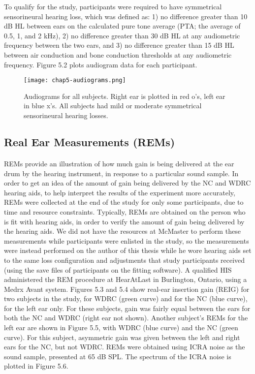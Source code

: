 To qualify for the study, participants were required to have symmetrical sensorineural hearing loss, which was defined as: 1) no difference greater than 10 dB HL between ears on the calculated pure tone average (PTA; the average of 0.5, 1, and 2 kHz), 2) no difference greater than 30 dB HL at any audiometric frequency between the two ears, and 3) no difference greater than 15 dB HL between air conduction and bone conduction thresholds at any audiometric frequency.  Figure 5.2 plots audiogram data for each participant.

\begin{figure}[htp]
\begin{center}
\texttt{[image: chap5-audiograms.png]}\\
\caption[Audiograms for all subjects]{Audiograms for all subjects.  Right ear is plotted in red o's, left ear in blue x's.  All subjects had mild or moderate symmetrical sensorineural hearing losses.}
\label{ch5-audiograms}
\end{center}
\end{figure}

\subsection{Real Ear Measurements (REMs)}
\paragraph{}REMs provide an illustration of how much gain is being delivered at the ear drum by the hearing instrument, in response to a particular sound sample.  In order to get an idea of the amount of gain being delivered by the NC and WDRC hearing aids, to help interpret the results of the experiment more accurately, REMs were collected at the end of the study for only some participants, due to time and resource constraints.  Typically, REMs are obtained on the person who is fit with hearing aids, in order to verify the amount of gain being delivered by the hearing aids.  We did not have the resources at McMaster to perform these measurements while participants were enlisted in the study, so the measurements were instead performed on the author of this thesis while he wore hearing aids set to the same loss configuration and adjustments that study participants received (using the save files of participants on the fitting software).  A qualified HIS administered the REM procedure at HearAtLast in Burlington, Ontario, using a Medrx Avant system.  Figures 5.3 and 5.4 show real-ear insertion gain (REIG) for two subjects in the study, for WDRC (green curve) and for the NC (blue curve), for the left ear only.  For these subjects, gain was fairly equal between the ears for both the NC and WDRC (right ear not shown).  Another subject's REMs for the left ear are shown in Figure 5.5, with WDRC (blue curve) and the NC (green curve).  For this subject, asymmetric gain was given between the left and right ears for the NC, but not WDRC.  REMs were obtained using ICRA noise as the sound sample, presented at 65 dB SPL.  The spectrum of the ICRA noise is plotted in Figure 5.6.

